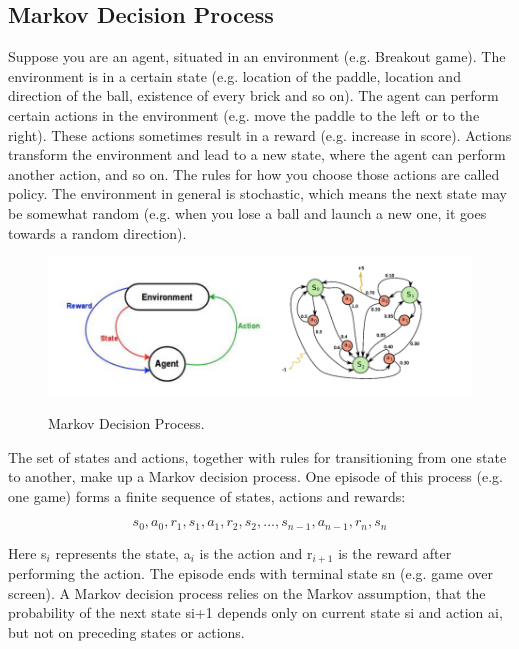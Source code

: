 \documentclass[a4paper,12pt]{report}
\begin{document}
			\subsection{Markov Decision Process}
				Suppose you are an agent, situated in an environment (e.g. Breakout game). The environment is in a certain state (e.g. location of the paddle, location and direction of the ball, existence of every brick and so on). The agent can perform certain actions in the environment (e.g. move the paddle to the left or to the right). These actions sometimes result in a reward (e.g. increase in score). Actions transform the environment and lead to a new state, where the agent can perform another action, and so on. The rules for how you choose those actions are called policy. The environment in general is stochastic, which means the next state may be somewhat random (e.g. when you lose a ball and launch a new one, it goes towards a random direction).
				\begin{figure}[!ht]
					\begin{centering}
						\includegraphics[width=15cm]{../Design/images/mdp.png}\\
						\caption{Markov Decision Process\cite{nervana}.}
					\end{centering}
				\end{figure}

				The set of states and actions, together with rules for transitioning from one state to another, make up a Markov decision process. One episode of this process (e.g. one game) forms a finite sequence of states, actions and rewards:

				\[ s_0,a_0,r_1,s_1,a_1,r_2,s_2, ... ,s_{n-1},a_{n-1},r_n,s_n\]

				Here s$_{i}$ represents the state, a$_i$ is the action and r$_{i+1}$ is the reward after performing the action. The episode ends with terminal state sn (e.g. game over screen). A Markov decision process relies on the Markov assumption, that the probability of the next state si+1 depends only on current state si and action ai, but not on preceding states or actions.
\end{document}
